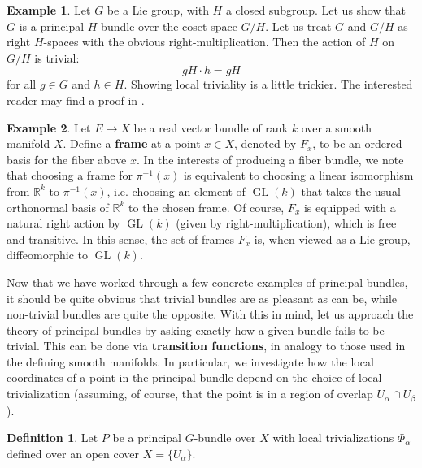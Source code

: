 \documentclass{book}
\newcommand{\R}{\mathbb{R}}
\DeclareMathOperator{\GL}{GL}
\theoremstyle{plain}
\theoremstyle{definition}
\newtheorem{defn}{Definition}
\newtheorem{exmp}{Example}
\theoremstyle{remark}
\begin{document}
\begin{exmp}
    Let $G$ be a Lie group, with $H$ a closed subgroup. Let us show that $G$ is a principal $H$-bundle over the coset space $G/H$.
    Let us treat $G$ and $G/H$ as right $H$-spaces with the obvious right-multiplication. Then the action of $H$ on $G/H$ is trivial:
    \[gH\cdot h = gH\]
    for all $g\in G$ and $h\in H$. Showing local triviality is a little trickier. The interested reader may find a proof in .
\end{exmp}

\begin{exmp}
    Let $E\to X$ be a real vector bundle of rank $k$ over a smooth manifold $X$.
    Define a \textbf{frame} at a point $x\in X$, denoted by $F_x$, to be an ordered basis for the fiber above $x$. In the interests of producing a fiber bundle,
    we note that choosing a frame for $\pi^{-1}(x)$ is equivalent to choosing a linear isomorphism from $\R^k$ to $\pi^{-1}(x)$, i.e. choosing an
    element of $\GL(k)$ that takes the usual orthonormal basis of $\R^k$ to the chosen frame. Of course, $F_x$ is equipped with a natural right action by
    $\GL(k)$ (given by right-multiplication), which is free and transitive. In this sense, the set of frames $F_x$ is, when viewed as a Lie group, diffeomorphic to $\GL(k)$.
\end{exmp}

Now that we have worked through a few concrete examples of principal bundles, it should be quite obvious that trivial bundles are as pleasant as can be,
while non-trivial bundles are quite the opposite. With this in mind, let us approach the theory of principal bundles by asking exactly how a
given bundle fails to be trivial. This can be done via \textbf{transition functions}, in analogy to those used in the defining smooth manifolds.
In particular, we investigate how the local coordinates of a point in the principal bundle depend on the choice of local trivialization (assuming, of
course, that the point is in a region of overlap $U_\alpha\cap U_\beta$).

\begin{defn}
    Let $P$ be a principal $G$-bundle over $X$ with local trivializations $\Phi_\alpha$ defined over an open cover $X=\{U_\alpha\}$. 
\end{defn}


\end{document}
